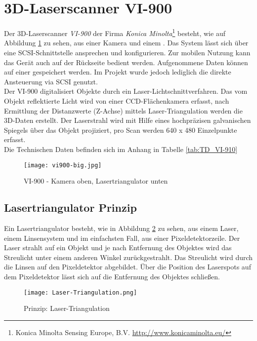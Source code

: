 \section{3D-Laserscanner VI-900}
\label{sec:VI-900}
Der 3D-Laserscanner \emph{VI-900} der Firma \emph{Konica Minolta}\footnote{Konica Minolta Sensing Europe, B.V. \url{http://www.konicaminolta.eu/}} besteht, wie auf Abbildung \ref{fig:VI900} zu sehen, aus einer Kamera und einem . Das System lässt sich über eine SCSI-Schnittstelle ansprechen und konfigurieren. Zur mobilen Nutzung kann das Gerät auch auf der Rückseite bedient werden. Aufgenommene Daten können auf einer  gespeichert werden. Im Projekt wurde jedoch lediglich die direkte Ansteuerung via SCSI genutzt.\\
Der VI-900 digitalisiert Objekte durch ein Laser-Lichtschnittverfahren. Das vom Objekt reflektierte Licht wird von einer CCD-Flächenkamera erfasst, nach Ermittlung der Distanzwerte (Z-Achse) mittels Laser-Triangulation werden die 3D-Daten erstellt. Der Laserstrahl wird mit Hilfe eines hochpräzisen galvanischen Spiegels über das Objekt projiziert, pro Scan werden 640 x 480 Einzelpunkte erfasst.\cite{Minolta:Einleitung}\\
Die Technischen Daten befinden sich im Anhang in Tabelle \ref{tab:TD_VI-910}
\begin{figure}[htb]
\centering
\texttt{[image: vi900-big.jpg]}
\caption{VI-900 - Kamera oben, Lasertriangulator unten}
\label{fig:VI900}
\end{figure}
\subsection{Lasertriangulator Prinzip}
\label{sec:LaserTri}
Ein Lasertriangulator besteht, wie in Abbildung \ref{fig:LaserTriangulator} zu sehen, aus einem Laser, einem Linsensystem und im einfachsten Fall, aus einer Pixeldetektorzeile. Der Laser strahlt auf ein Objekt und je nach Entfernung des Objektes wird das Streulicht unter einem anderen Winkel zurückgestrahlt. Das Streulicht wird durch die Linsen auf den Pixeldetektor abgebildet. Über die Position des Laserspots auf dem Pixeldetektor lässt sich auf die Entfernung des Objektes schließen.
\begin{figure}[h]
\centering
\texttt{[image: Laser-Triangulation.png]}
\caption{Prinzip: Laser-Triangulation}
\label{fig:LaserTriangulator}
\end{figure}

